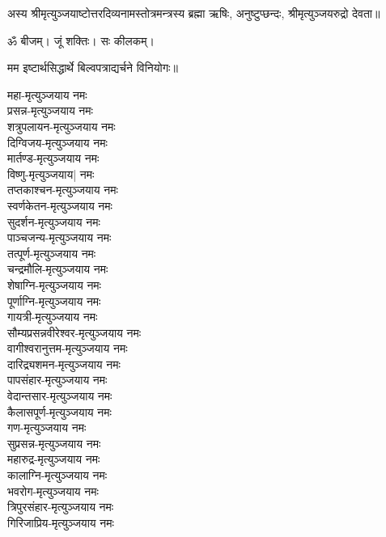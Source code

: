 

अस्य श्रीमृत्युञ्जयाष्टोत्तरदिव्यनामस्तोत्रमन्त्रस्य ब्रह्मा ऋषिः, अनुष्टुप्छन्दः, श्रीमृत्युञ्जयरुद्रो देवता॥ 

ॐ बीजम्। जूं शक्तिः। सः कीलकम्। 

मम इष्टार्थसिद्धार्थे बिल्वपत्राद्यर्चने विनियोगः॥ 

\begin{multicols}{2}
\begin{flushleft}
महा-मृत्युञ्जयाय नमः\\
प्रसन्न-मृत्युञ्जयाय नमः\\
शत्रुपलायन-मृत्युञ्जयाय नमः\\
दिग्विजय-मृत्युञ्जयाय नमः\\
मार्तण्ड-मृत्युञ्जयाय नमः\\
विष्णु-मृत्युञ्जयाय| नमः\\
तप्तकाश्चन-मृत्युञ्जयाय नमः\\
स्वर्णकेतन-मृत्युञ्जयाय नमः\\
सुदर्शन-मृत्युञ्जयाय नमः\\
पाञ्चजन्य-मृत्युञ्जयाय नमः\hfill{}\\
तत्पूर्ण-मृत्युञ्जयाय नमः\\
चन्द्रमौलि-मृत्युञ्जयाय नमः\\
शेषाग्नि-मृत्युञ्जयाय नमः\\
पूर्णाग्नि-मृत्युञ्जयाय नमः\\
गायत्री-मृत्युञ्जयाय नमः\\
सौम्यप्रसन्नवीरेश्वर-मृत्युञ्जयाय नमः\\
वागीश्वरानुत्तम-मृत्युञ्जयाय नमः\\
दारिद्र्यशमन-मृत्युञ्जयाय नमः\\
पापसंहार-मृत्युञ्जयाय नमः\\
वेदान्तसार-मृत्युञ्जयाय नमः\hfill{}\\
कैलासपूर्ण-मृत्युञ्जयाय नमः\\
गण-मृत्युञ्जयाय नमः\\
सुप्रसन्न-मृत्युञ्जयाय नमः\\
महारुद्र-मृत्युञ्जयाय नमः\\
कालाग्नि-मृत्युञ्जयाय नमः\\
भवरोग-मृत्युञ्जयाय नमः\\
त्रिपुरसंहार-मृत्युञ्जयाय नमः\\
गिरिजाप्रिय-मृत्युञ्जयाय नमः\\

\end{flushleft}
\end{multicols}
